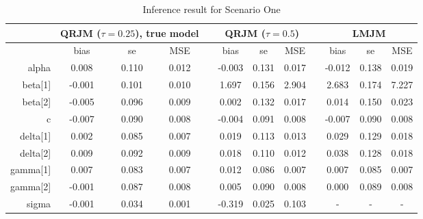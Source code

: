\documentclass{article}
\begin{document}
\begin{table}[H]
\centering
\caption{Inference result for Scenario One}
\begin{tabular}{rccccccccccc}
\hline
& \multicolumn{3}{c}{QRJM ($\tau=0.25$), true model} & &\multicolumn{3}{c}{QRJM ($\tau=0.5$)} & & \multicolumn{3}{c}{LMJM}\\
\hline
 & bias & se & MSE & & bias & se & MSE & & bias & se & MSE \\
 \cline{2-4}  \cline{6-8}  \cline{10-12}
  alpha & 0.008 & 0.110 & 0.012 & & -0.003 & 0.131 & 0.017 & & -0.012 & 0.138 & 0.019 \\
  beta[1] & -0.001 & 0.101 & 0.010 & & 1.697 & 0.156 & 2.904 & & 2.683 & 0.174 & 7.227 \\
  beta[2] & -0.005 & 0.096 & 0.009 & & 0.002 & 0.132 & 0.017 & & 0.014 & 0.150 & 0.023 \\
  c & -0.007 & 0.090 & 0.008 & & -0.004 & 0.091 & 0.008 & & -0.007 & 0.090 & 0.008 \\
  delta[1] & 0.002 & 0.085 & 0.007 & & 0.019 & 0.113 & 0.013 & & 0.029 & 0.129 & 0.018 \\
  delta[2] & 0.009 & 0.092 & 0.009 & & 0.018 & 0.110 & 0.012 & & 0.038 & 0.128 & 0.018 \\
  gamma[1] & 0.007 & 0.083 & 0.007 & & 0.012 & 0.086 & 0.007 & & 0.007 & 0.085 & 0.007 \\
  gamma[2] & -0.001 & 0.087 & 0.008 & & 0.005 & 0.090 & 0.008 & & 0.000 & 0.089 &  0.008 \\
  sigma & -0.001 & 0.034 & 0.001 & & -0.319 & 0.025 & 0.103 & & - & - & - \\
   \hline
\end{tabular}
\end{table}
\end{document}
